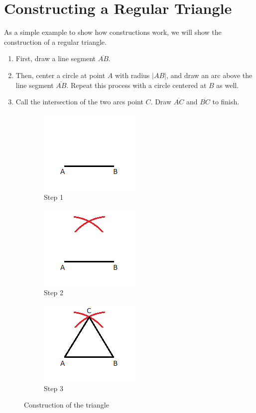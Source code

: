 \documentclass[reqno]{amsart}
\theoremstyle{definition}
\numberwithin{equation}{section}
\begin{document}
\section{Constructing a Regular Triangle}\label{sec:2}

As a simple example to show how constructions work, we will show the construction of a regular triangle.
\begin{enumerate}
    \item First, draw a line segment $\overline{AB}$.
    \item Then, center a circle at point $A$ with radius $|AB|$, and draw an arc above the line segment $\overline{AB}$. Repeat this process with a circle centered at $B$ as well.
    \item Call the intersection of the two arcs point $C$. Draw $\overline{AC}$ and $\overline{BC}$ to finish.
\end{enumerate}
\begin{figure}[h]
\centering
\begin{subfigure}{0.3\textwidth}
\centering
\includegraphics[scale=0.7]{step1.png}
\caption{Step 1}
\label{fig:subim1}
\end{subfigure}
\begin{subfigure}{0.3\textwidth}
\centering
\includegraphics[scale=0.7]{step2.png}
\caption{Step 2}
\label{fig:subim2}
\end{subfigure}
\begin{subfigure}{0.3\textwidth}
\centering
\includegraphics[scale=0.7]{step3.png}
\caption{Step 3}
\label{fig:subim3}
\end{subfigure}
\caption{Construction of the triangle}
\label{fig:1}
\end{figure}
\end{document}
